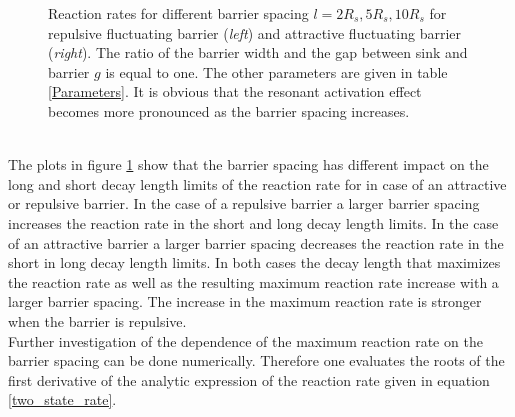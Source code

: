 \begin{minipage}[t]{1 \textwidth}
    \begin{figure}[H]
        \caption{Reaction rates for different barrier spacing $l = 2 R_s, 5 R_s ,10 R_s$ for repulsive fluctuating barrier (\emph{left}) and attractive fluctuating barrier (\emph{right}). The ratio of the barrier width and the gap between sink and barrier $g$ is equal to one. The other parameters are given in table \ref{Parameters}. It is obvious that the resonant activation effect becomes more pronounced as the barrier spacing increases.\label{fig:var_l}}
    \end{figure}
\end{minipage} \vspace{0.5 cm} \\
The plots in figure \ref{fig:var_l} show that the barrier spacing has different impact on the long and short decay length limits of the reaction rate for in case of an attractive or repulsive barrier.
In the case of a repulsive barrier a larger barrier spacing increases the reaction rate in the short and long decay length limits. In the case of an attractive barrier a larger barrier spacing decreases the reaction rate in the short in long decay length limits. In both cases the decay length that maximizes the reaction rate as well as the resulting maximum reaction rate increase with a larger barrier spacing. The increase in the maximum reaction rate is stronger when the barrier is repulsive.\\
Further investigation of the dependence of the maximum reaction rate on the barrier spacing can be done numerically. Therefore one evaluates the roots of the first derivative of the analytic expression of the reaction rate given in equation \eqref{two_state_rate}. \\
\vspace{-0.5 cm}

